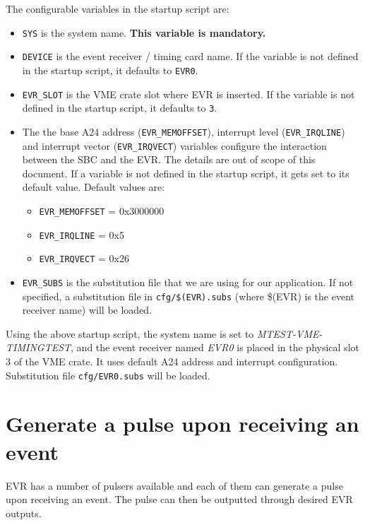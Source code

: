 \documentclass[12pt,a4paper]{article}
\begin{document}
\begin{enumerate}
The configurable variables in the startup script are:
\begin{itemize}
	\item
		\texttt{SYS} is the system name. \textbf{This variable is mandatory.}
	\item 
		\texttt{DEVICE} is the event receiver / timing card name. If the variable is not defined in the startup script, it defaults to \texttt{EVR0}.
	\item 
		\texttt{EVR\_SLOT} is the VME crate slot where EVR is inserted. If the variable is not defined in the startup script, it defaults to \texttt{3}.
	\item 
		The the base A24 address (\texttt{EVR\_MEMOFFSET}), interrupt level (\texttt{EVR\_IRQLINE}) and interrupt vector (\texttt{EVR\_IRQVECT}) variables configure the interaction between the SBC and the EVR. The details are out of scope of this document. If a variable is not defined in the startup script, it gets set to its default value. Default values are:
		\begin{itemize}
		\item \texttt{EVR\_MEMOFFSET} = 0x3000000
		\item \texttt{EVR\_IRQLINE} = 0x5
		\item \texttt{EVR\_IRQVECT} = 0x26
		\end{itemize}
	\item 
		\texttt{EVR\_SUBS} is the substitution file that we are using for our application. If not specified, a substitution file in \texttt{cfg/\$(EVR).subs} (where \$(EVR) is the event receiver name) will be loaded.
\end{itemize}
Using the above startup script, the system name is set to \textit{MTEST-VME-TIMINGTEST}, and the event receiver named \textit{EVR0} is placed in the physical slot 3 of the VME crate. It uses default A24 address and interrupt configuration. Substitution file \texttt{cfg/EVR0.subs} will be loaded.
\end{enumerate}


\section{Generate a pulse upon receiving an event}
EVR has a number of pulsers available and each of them can generate a pulse upon receiving an event. The pulse can then be outputted through desired EVR outputs. 
\end{document}
